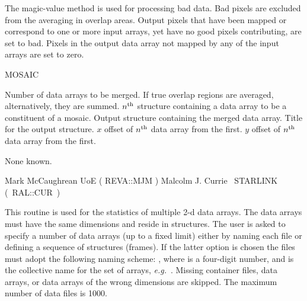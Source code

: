 {\begin{manroutinedescription}
  The magic-value method is used for processing bad data.  Bad
  pixels are excluded from the averaging in overlap areas. Output
  pixels that have been mapped or correspond to one or more input
  arrays, yet have no good pixels contributing, are set to bad.
  Pixels in the output data array not mapped by any of the input
  arrays are set to zero.

  MOSAIC

\begin{manparametertable}
  Number of data arrays to be merged.
  If true overlap regions are averaged, alternatively, they are
  summed.  \mbox{{\mantt [TRUE]}}
  {$n^{\rm th}$} {} structure containing a data array to be a
  constituent of a mosaic.
  Output {} structure containing the merged data array.
  Title for the output {} structure. \mbox{{}}
  {$x$} offset of {$n^{\rm th}$} data array from the first.
  {$y$} offset of {$n^{\rm th}$} data array from the first.
\end{manparametertable}
  None known.

  Mark McCaughrean UoE ( {\mantt REVA}::{\mantt MJM} )
  Malcolm J. Currie ~STARLINK \mbox{( {\mantt RAL}::{\mantt CUR} )}
\end{manroutinedescription}

\begin{manroutinedescription}
  This routine is used for the statistics of multiple 2-d data
  arrays. The data arrays must have the same dimensions and reside
  in {} structures. The user is asked to specify a number of
  data arrays (up to a fixed limit) either by naming each file
  or defining a sequence of {} structures (frames). If the
  latter option is chosen the files must adopt the following naming scheme:
  {}, where {} is a four-digit number,
  and {} is the collective name for the set of arrays,
  {\it e.g.}\ {}. Missing
  container files, data arrays, or data arrays of the wrong
  dimensions are skipped. The maximum number of data files is 1000.


\end{manroutinedescription}}
